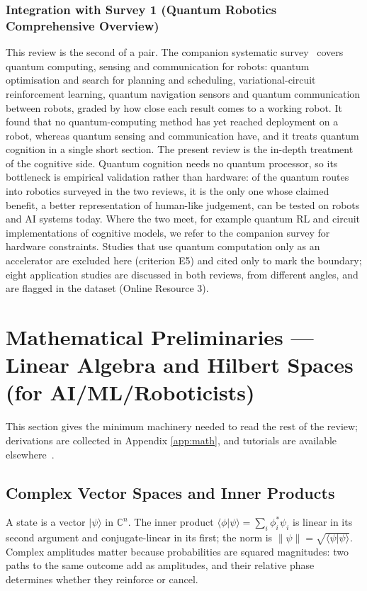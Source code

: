 \documentclass[pdflatex,sn-basic]{sn-jnl}
\newcommand{\ket}[1]{|#1\rangle}
\begin{document}
\subsubsection{Integration with Survey 1 (Quantum Robotics Comprehensive Overview)}\label{sec:era5-s1}
This review is the second of a pair. The companion systematic survey~\citep{Guru2026} covers quantum computing, sensing and communication for robots: quantum optimisation and search for planning and scheduling, variational-circuit reinforcement learning, quantum navigation sensors and quantum communication between robots, graded by how close each result comes to a working robot. It found that no quantum-computing method has yet reached deployment on a robot, whereas quantum sensing and communication have, and it treats quantum cognition in a single short section. The present review is the in-depth treatment of the cognitive side. Quantum cognition needs no quantum processor, so its bottleneck is empirical validation rather than hardware: of the quantum routes into robotics surveyed in the two reviews, it is the only one whose claimed benefit, a better representation of human-like judgement, can be tested on robots and AI systems today. Where the two meet, for example quantum RL and circuit implementations of cognitive models, we refer to the companion survey for hardware constraints. Studies that use quantum computation only as an accelerator are excluded here (criterion E5) and cited only to mark the boundary; eight application studies are discussed in both reviews, from different angles, and are flagged in the dataset (Online Resource 3).


\section{Mathematical Preliminaries --- Linear Algebra and Hilbert Spaces (for AI/ML/Roboticists)}\label{sec:math}
This section gives the minimum machinery needed to read the rest of the review; derivations are collected in Appendix \ref{app:math}, and tutorials are available elsewhere~\citep{Yearsley2016a,Yearsley2017}.

\subsection{Complex Vector Spaces and Inner Products}\label{sec:vec}
A state is a vector $\ket{\psi}$ in $\mathbb{C}^n$. The inner product $\langle\phi|\psi\rangle = \sum_i \phi_i^{*}\psi_i$ is linear in its second argument and conjugate-linear in its first; the norm is $\lVert\psi\rVert = \sqrt{\langle\psi|\psi\rangle}$. Complex amplitudes matter because probabilities are squared magnitudes: two paths to the same outcome add as amplitudes, and their relative phase determines whether they reinforce or cancel.
\end{document}
